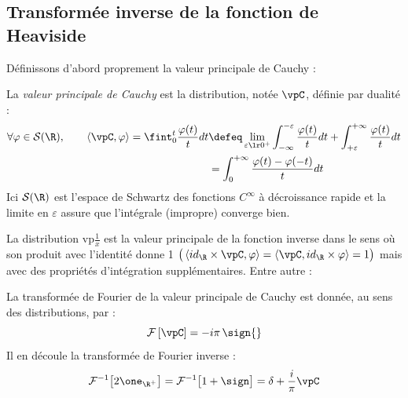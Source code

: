 \begin{annexe}
\subsection{Transformée inverse de la fonction de Heaviside}\label{ann:transfo_SA}

Définissons d'abord proprement la valeur principale de Cauchy :

\begin{definition}\label{def:vp&Hilb}
	La \emph{valeur principale de Cauchy} est la distribution, notée $\vpC$, définie par dualité :
	\begin{equation}
		\begin{aligned}
			\forall \varphi\in\mathcal{S}(\R),\qquad 
			\left\langle \vpC, \varphi \right\rangle 
			= \fint_0^t \frac{\varphi(t)}{t}dt 
			&\defeq \lim_{\varepsilon\lr0^+} \int_{-\infty}^{-\varepsilon} \frac{\varphi(t)}{t}dt + \int_{+\varepsilon}^{+\infty} \frac{\varphi(t)}{t}dt \\
			&= \int_0^{+\infty} \frac{\varphi(t) - \varphi(-t)}{t}dt
		\end{aligned}
	\end{equation}
	Ici $\mathcal{S}(\R)$ est l’espace de Schwartz des fonctions $C^\infty$ à décroissance rapide et la limite en $\varepsilon$ assure que l'intégrale (impropre) converge bien.
\end{definition}
\skipl

La distribution vp$\frac{1}{x}$ est la valeur principale de la fonction inverse dans le sens où son produit avec l'identité donne 1 $\big(\left\langle id_\R \times \vpC, \varphi \right\rangle = \left\langle \vpC, id_\R \times\varphi \right\rangle=1\big)$ mais avec des propriétés d'intégration supplémentaires. Entre autre :

\begin{propriete}\label{prop:fou2vp}
	La transformée de Fourier de la valeur principale de Cauchy est donnée, au sens des distributions, par :
	\begin{equation}
		\mathcal{F} \left[\vpC \right]= -i \pi\, \sign{} 
	\end{equation}
	Il en découle la transformée de Fourier inverse :
	\begin{equation}
		\mathcal{F}^{-1}\big[ 2\one_{\R^+} \big] = \mathcal{F}^{-1}\big[ 1 + \sign \big] = \delta + \frac{i}{\pi} \vpC
	\end{equation}
\end{propriete}


\end{annexe}
